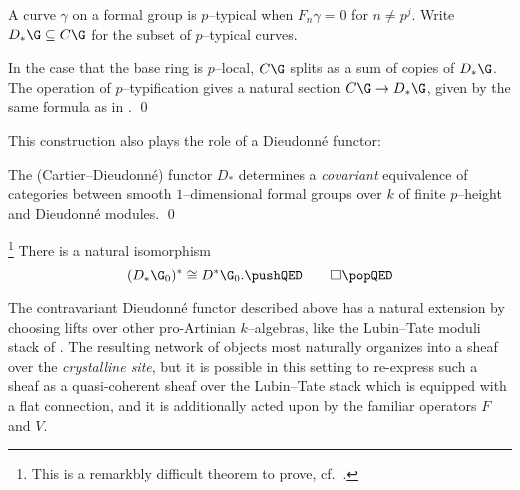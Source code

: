 \begin{definition}
A curve \(\gamma\) on a formal group is \(p\)--typical when \(F_n \gamma = 0\) for \(n \ne p^j\).  Write \(D_*\G \subseteq C\G\) for the subset of \(p\)--typical curves.
\end{definition}

\begin{lemma}
In the case that the base ring is \(p\)--local, \(C\G\) splits as a sum of copies of \(D_* \G\).  The operation of \(p\)--typification gives a natural section \(C\G \to D_* \G\), given by the same formula as in . \qed
\end{lemma}

This construction also plays the role of a Dieudonn\'e functor:

\begin{theorem}\label{CurveDieudonneTheorem}
The (Cartier--Dieudonn\'e) functor \(D_*\) determines a \emph{covariant} equivalence of categories between smooth \(1\)--dimensional formal groups over \(k\) of finite \(p\)--height and Dieudonn\'e modules. \qed
\end{theorem}

\begin{theorem}\label{DieudonneDualityThm}\footnote{This is a remarkbly difficult theorem to prove, cf.\ .}
There is a natural isomorphism \[(D_* \G_0)^* \cong D^* \G_0. \pushQED\qed\qedhere\popQED\]
\end{theorem}

\begin{remark}
The contravariant Dieudonn\'e functor described above has a natural extension by choosing lifts over other pro-Artinian \(k\)--algebras, like the Lubin--Tate moduli stack of .  The resulting network of objects most naturally organizes into a sheaf over the \textit{crystalline site}, but it is possible in this setting to re-express such a sheaf as a quasi-coherent sheaf over the Lubin--Tate stack which is equipped with a flat connection, and it is additionally acted upon by the familiar operators \(F\) and \(V\).
\end{remark}

